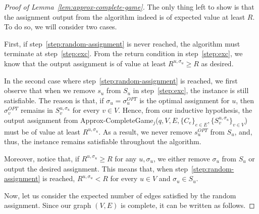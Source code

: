 \documentclass{article}
\begin{document}
\begin{proof}[Proof of Lemma~\ref{lem:approx-complete-game}]
The only thing left to show is that the assignment output from the algorithm indeed is of expected value at least $R$. To do so, we will consider two cases.

First, if step~\ref{step:random-assignment} is never reached, the algorithm must terminate at step~\ref{step:exc}. From the return condition in step~\ref{step:exc}, we know that the output assignment is of value at least $R^{u, \sigma_u} \geq R$ as desired.

In the second case where step~\ref{step:random-assignment} is reached, we first observe that when we remove $s_u$ from $S_u$ in step~\ref{step:exc}, the instance is still satisfiable. The reason is that, if $\sigma_u = \sigma_u^{OPT}$ is the optimal assignment for $u$, then $\sigma_v^{OPT}$ remains in $S_v^{u, \sigma_u}$ for every $v \in V$. Hence, from our inductive hypothesis, the output assignment from {\sc Approx-CompleteGame$_j$}($q, V, E, \{C_{e}\}_{e \in E}, \{S_v^{u, \sigma_u}\}_{v \in V}$) must be of value at least $R^{u, \sigma_u}$. As a result, we never remove $s^{OPT}_u$ from $S_u$, and, thus, the instance remains satisfiable throughout the algorithm.

Moreover, notice that, if $R^{u, \sigma_u} \geq R$ for any $u, \sigma_u$, we either remove $\sigma_u$ from $S_u$ or output the desired assignment. This means that, when step~\ref{step:random-assignment} is reached, $R^{u, \sigma_u} < R$ for every $u \in V$ and $\sigma_u \in S_u$.

Now, let us consider the expected number of edges satisfied by the random assignment. Since our graph $(V, E)$ is complete, it can be written as follows.


\end{proof}
\end{document}
